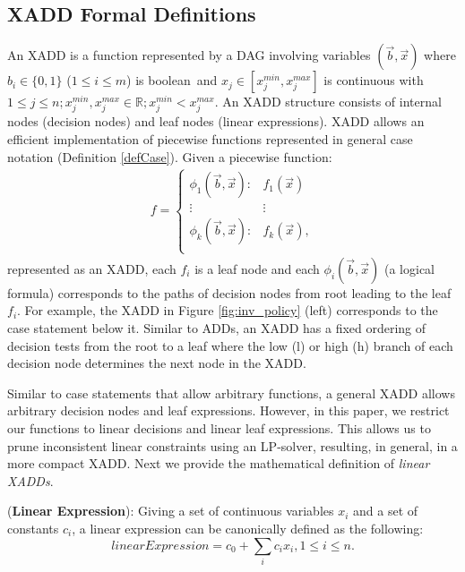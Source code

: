\documentclass[twoside,11pt]{article}
\newenvironment{mydef}[1][Definition]{\begin{trivlist}
\item[\hskip \labelsep {\bfseries #1}]}{\end{trivlist}}
\begin{document}
\subsection{XADD Formal Definitions}
\label{xaddformal}
An XADD is a function represented by a DAG involving variables $(\vec{b},\vec{x})$ where $b_i \in \{ 0,1 \}$ ($1 \leq i \leq m$) is boolean$\,$
and $x_j \in \left[ x_j^{min}, x_j^{max}\right]$ is continuous with $1 \leq j \leq n; x_j^{min}, x_j^{max} \in \mathbb{R}; x_j^{min}< x_j^{max}$.
An XADD structure consists of internal nodes (decision nodes) and leaf nodes (linear expressions).
XADD allows an efficient implementation of piecewise functions represented in general case notation (Definition \ref{defCase}).
{%
Given a piecewise function:
\begin{align}
f = 
\begin{cases}
  \phi_1(\vec{b},\vec{x}): & f_1 (\vec{x})\\ 
 \vdots&\vdots\\ 
  \phi_k(\vec{b},\vec{x}): & f_k(\vec{x}), \\ 
\end{cases} \label{eq:function_xadd}
\end{align}
}
represented as an XADD, each $f_i$ is a leaf node and each $\phi_i(\vec{b},\vec{x})$ (a logical formula) corresponds to the paths of decision nodes from root leading to the leaf $f_i$. For example, the XADD in Figure \ref{fig:inv_policy} (left) corresponds to the case statement below it.
Similar to ADDs, an XADD has a fixed ordering of decision tests from the root to a leaf where the low (l) or high (h) branch of each decision node determines the next node in the XADD.  

Similar to case statements that allow arbitrary functions,  a general XADD allows arbitrary decision nodes and leaf expressions. However, in this paper, we restrict our functions to linear decisions and linear leaf expressions. This allows us to prune inconsistent linear constraints using an LP-solver, resulting, in general, in a more compact XADD. Next we provide the mathematical definition of \emph{linear XADDs}. %

\begin{mydef}(\textbf{Linear Expression}):
Giving a set of continuous variables $x_i$ and a set of constants $c_i$, a linear expression can be canonically defined  as the following:
\begin{equation}
\mathit{linearExpression} = c_0+\sum_{i} c_i x_i , 1 \leq i \leq n. 
\label{Eq:canonical}
\end{equation}
\end{mydef}
\end{document}
